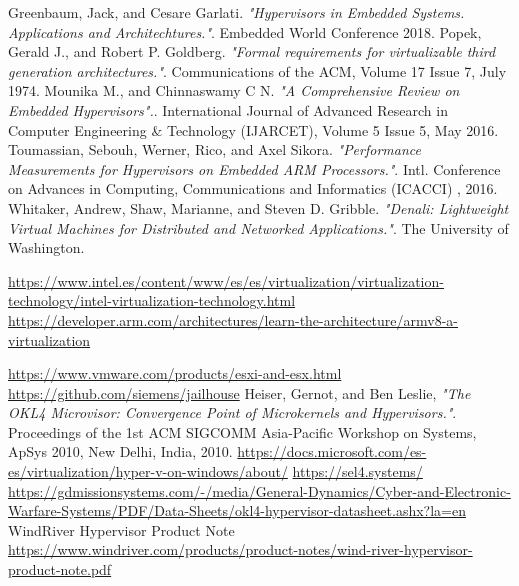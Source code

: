\documentclass[spanish,12pt,a4paper,oneside]{book}
\begin{document}
\begin{thebibliography}{00}

	  Greenbaum, Jack, and Cesare Garlati. \emph{"Hypervisors in Embedded Systems. Applications and Architechtures."}. Embedded World Conference 2018.
	 Popek, Gerald J., and Robert P. Goldberg. \emph{"Formal requirements for virtualizable third generation architectures."}. Communications of the ACM, Volume 17 Issue 7, July 1974.
	 Mounika M., and Chinnaswamy C N. \emph{"A Comprehensive Review on Embedded Hypervisors".}. International Journal of Advanced Research in Computer Engineering \& Technology (IJARCET), Volume 5 Issue 5, May 2016.
	 Toumassian, Sebouh, Werner, Rico, and Axel Sikora. \emph{"Performance Measurements for Hypervisors on Embedded ARM Processors."}. Intl. Conference on Advances in Computing, Communications and Informatics (ICACCI) , 2016.
	 Whitaker, Andrew, Shaw, Marianne, and Steven D. Gribble. \emph{"Denali: Lightweight Virtual Machines for Distributed and Networked Applications."}. The University of Washington.

   \url{https://www.intel.es/content/www/es/es/virtualization/virtualization-technology/intel-virtualization-technology.html}
   \url{https://developer.arm.com/architectures/learn-the-architecture/armv8-a-virtualization}


   \url{https://www.vmware.com/products/esxi-and-esx.html}
   \url{https://github.com/siemens/jailhouse}
   Heiser, Gernot, and Ben Leslie, \emph{"The OKL4 Microvisor: Convergence Point of Microkernels and Hypervisors."}. Proceedings of the 1st ACM SIGCOMM Asia-Pacific Workshop on Systems, ApSys 2010, New Delhi, India, 2010.
   \url{https://docs.microsoft.com/es-es/virtualization/hyper-v-on-windows/about/}
   \url{https://sel4.systems/}
   \url{https://gdmissionsystems.com/-/media/General-Dynamics/Cyber-and-Electronic-Warfare-Systems/PDF/Data-Sheets/okl4-hypervisor-datasheet.ashx?la=en}
   WindRiver Hypervisor Product Note \url{https://www.windriver.com/products/product-notes/wind-river-hypervisor-product-note.pdf}



\end{thebibliography}
\end{document}
